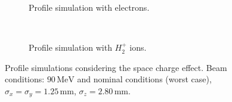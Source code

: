 \begin{figure}[!ht]
	\begin{subfigure}[t]{0.5\textwidth}
		
		\caption[Profile simulation with electrons]{Profile simulation with electrons.}
		\label{chap3:fig:SC_profile_a}
	\end{subfigure}
	~
	\begin{subfigure}[t]{0.5\textwidth}
		
		\caption[Profile simulation with $H^{+}_{2}$ ions]{Profile simulation with $H^{+}_{2}$ ions.}
		\label{chap3:fig:SC_profile_b}
	\end{subfigure}
  \caption[Profile simulations considering the space charge effect]{Profile simulations considering the space charge effect. Beam conditions: $90\,\mathrm{MeV}$ and nominal conditions (worst case), $\sigma_{x}=\sigma_{y}=1.25\,\mathrm{mm}$, $\sigma_{z} = 2.80\,\mathrm{mm}$.}
	\label{chap3:fig:SC_profile2}
\end{figure}
